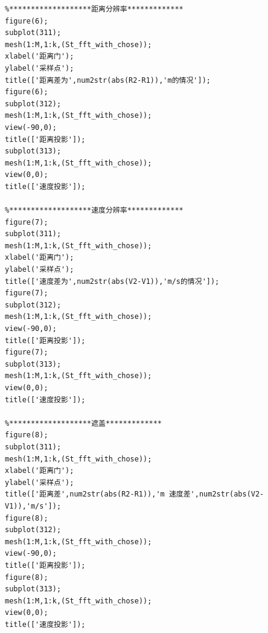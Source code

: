 \documentclass[12pt]{article}
\begin{document}
\begin{lstlisting}
%*******************距离分辨率*************
figure(6);
subplot(311);
mesh(1:M,1:k,(St_fft_with_chose));
xlabel('距离门');
ylabel('采样点');
title(['距离差为',num2str(abs(R2-R1)),'m的情况']);
figure(6);
subplot(312);
mesh(1:M,1:k,(St_fft_with_chose));
view(-90,0);
title(['距离投影']);
subplot(313);
mesh(1:M,1:k,(St_fft_with_chose));
view(0,0);
title(['速度投影']);

%*******************速度分辨率*************
figure(7);
subplot(311);
mesh(1:M,1:k,(St_fft_with_chose));
xlabel('距离门');
ylabel('采样点');
title(['速度差为',num2str(abs(V2-V1)),'m/s的情况']);
figure(7);
subplot(312);
mesh(1:M,1:k,(St_fft_with_chose));
view(-90,0);
title(['距离投影']);
figure(7);
subplot(313);
mesh(1:M,1:k,(St_fft_with_chose));
view(0,0);
title(['速度投影']);

%*******************遮盖*************
figure(8);
subplot(311);
mesh(1:M,1:k,(St_fft_with_chose));
xlabel('距离门');
ylabel('采样点');
title(['距离差',num2str(abs(R2-R1)),'m 速度差',num2str(abs(V2-V1)),'m/s']);
figure(8);
subplot(312);
mesh(1:M,1:k,(St_fft_with_chose));
view(-90,0);
title(['距离投影']);
figure(8);
subplot(313);
mesh(1:M,1:k,(St_fft_with_chose));
view(0,0);
title(['速度投影']);
\end{lstlisting}
\end{document}
